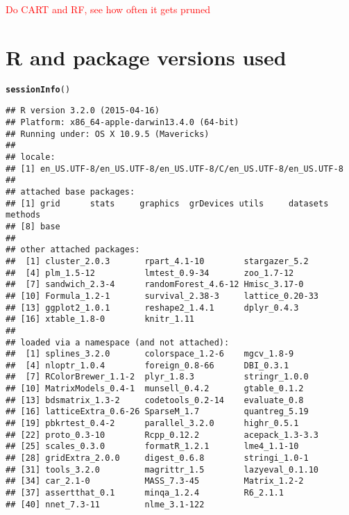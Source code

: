 \documentclass[11pt]{article}\usepackage[]{graphicx}\usepackage[]{color}
\makeatletter
\newcommand{\hlstd}[1]{\textcolor[rgb]{0.345,0.345,0.345}{#1}}%
\newcommand{\hlkwd}[1]{\textcolor[rgb]{0.737,0.353,0.396}{\textbf{#1}}}%
\newenvironment{kframe}{%
 \def\at@end@of@kframe{}%
 \ifinner\ifhmode%
  \def\at@end@of@kframe{\end{minipage}}%
  \begin{minipage}{\columnwidth}%
 \fi\fi%
 \def\FrameCommand##1{\hskip\@totalleftmargin \hskip-\fboxsep
 \colorbox{shadecolor}{##1}\hskip-\fboxsep
     \hskip-\linewidth \hskip-\@totalleftmargin \hskip\columnwidth}%
 \MakeFramed {\advance\hsize-\width
   \@totalleftmargin\z@ \linewidth\hsize
   \@setminipage}}%
 {\par\unskip\endMakeFramed%
 \at@end@of@kframe}
\newenvironment{knitrout}{}{} %
\makeatother
\begin{document}
\clearpage

\textcolor{red}{Do CART and RF, see how often it gets pruned}

\section{R and package versions used}
\begin{knitrout}
\color{fgcolor}\begin{kframe}
\begin{alltt}
\hlkwd{sessionInfo}\hlstd{()}
\end{alltt}
\begin{verbatim}
## R version 3.2.0 (2015-04-16)
## Platform: x86_64-apple-darwin13.4.0 (64-bit)
## Running under: OS X 10.9.5 (Mavericks)
## 
## locale:
## [1] en_US.UTF-8/en_US.UTF-8/en_US.UTF-8/C/en_US.UTF-8/en_US.UTF-8
## 
## attached base packages:
## [1] grid      stats     graphics  grDevices utils     datasets  methods  
## [8] base     
## 
## other attached packages:
##  [1] cluster_2.0.3       rpart_4.1-10        stargazer_5.2      
##  [4] plm_1.5-12          lmtest_0.9-34       zoo_1.7-12         
##  [7] sandwich_2.3-4      randomForest_4.6-12 Hmisc_3.17-0       
## [10] Formula_1.2-1       survival_2.38-3     lattice_0.20-33    
## [13] ggplot2_1.0.1       reshape2_1.4.1      dplyr_0.4.3        
## [16] xtable_1.8-0        knitr_1.11         
## 
## loaded via a namespace (and not attached):
##  [1] splines_3.2.0       colorspace_1.2-6    mgcv_1.8-9         
##  [4] nloptr_1.0.4        foreign_0.8-66      DBI_0.3.1          
##  [7] RColorBrewer_1.1-2  plyr_1.8.3          stringr_1.0.0      
## [10] MatrixModels_0.4-1  munsell_0.4.2       gtable_0.1.2       
## [13] bdsmatrix_1.3-2     codetools_0.2-14    evaluate_0.8       
## [16] latticeExtra_0.6-26 SparseM_1.7         quantreg_5.19      
## [19] pbkrtest_0.4-2      parallel_3.2.0      highr_0.5.1        
## [22] proto_0.3-10        Rcpp_0.12.2         acepack_1.3-3.3    
## [25] scales_0.3.0        formatR_1.2.1       lme4_1.1-10        
## [28] gridExtra_2.0.0     digest_0.6.8        stringi_1.0-1      
## [31] tools_3.2.0         magrittr_1.5        lazyeval_0.1.10    
## [34] car_2.1-0           MASS_7.3-45         Matrix_1.2-2       
## [37] assertthat_0.1      minqa_1.2.4         R6_2.1.1           
## [40] nnet_7.3-11         nlme_3.1-122
\end{verbatim}
\end{kframe}
\end{knitrout}
\end{document}
